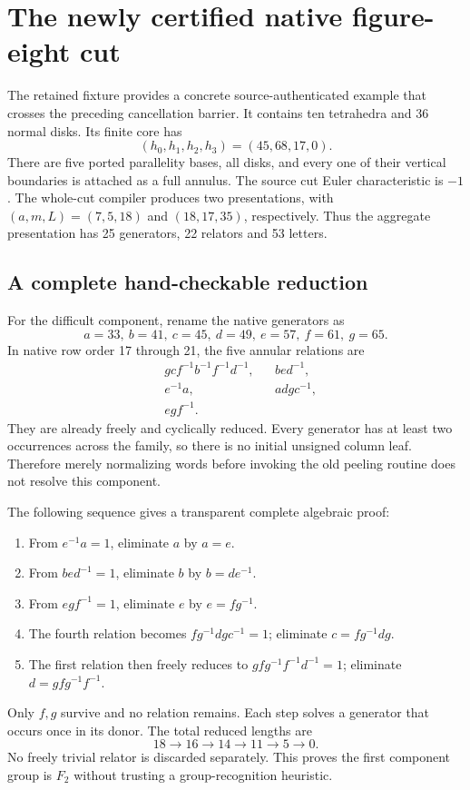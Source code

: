 \section{The newly certified native figure-eight cut}
\label{sec:native-target}

The retained fixture  provides a concrete
source-authenticated example that crosses the preceding cancellation barrier.
It contains ten tetrahedra and 36 normal disks. Its finite core has
\[
 (h_0,h_1,h_2,h_3)=(45,68,17,0).
\]
There are five ported parallelity bases, all disks, and every one of their
vertical boundaries is attached as a full annulus. The source cut Euler
characteristic is $-1$. The whole-cut compiler produces two presentations,
with $(a,m,L)=(7,5,18)$ and $(18,17,35)$, respectively. Thus the aggregate
presentation has 25 generators, 22 relators and 53 letters.

\subsection{A complete hand-checkable reduction}

For the difficult component, rename the native generators as
\[
 a=33,\ b=41,\ c=45,\ d=49,\ e=57,\ f=61,\ g=65.
\]
In native row order 17 through 21, the five annular relations are
\begin{align*}
 &gcf^{-1}b^{-1}f^{-1}d^{-1}, & &bed^{-1},\\
 &e^{-1}a, & &adgc^{-1},\\
 &egf^{-1}. &&
\end{align*}
They are already freely and cyclically reduced. Every generator has at least
two occurrences across the family, so there is no initial unsigned column
leaf. Therefore merely normalizing words before invoking the old peeling
routine does not resolve this component.

The following sequence gives a transparent complete algebraic proof:
\begin{enumerate}
\item From $e^{-1}a=1$, eliminate $a$ by $a=e$.
\item From $bed^{-1}=1$, eliminate $b$ by $b=de^{-1}$.
\item From $egf^{-1}=1$, eliminate $e$ by $e=fg^{-1}$.
\item The fourth relation becomes $fg^{-1}dgc^{-1}=1$; eliminate
      $c=fg^{-1}dg$.
\item The first relation then freely reduces to
      $gfg^{-1}f^{-1}d^{-1}=1$; eliminate $d=gfg^{-1}f^{-1}$.
\end{enumerate}
Only $f,g$ survive and no relation remains. Each step solves a generator that
occurs once in its donor. The total reduced lengths are
\[
 18\longrightarrow16\longrightarrow14\longrightarrow11
 \longrightarrow5\longrightarrow0.
\]
No freely trivial relator is discarded separately. This proves the first
component group is $F_2$ without trusting a group-recognition heuristic.

